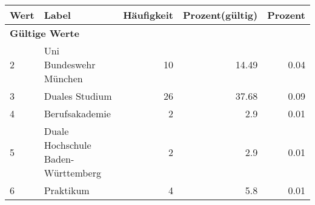      \begin{longtable}{lXrrr}
     \toprule
     \textbf{Wert} & \textbf{Label} & \textbf{Häufigkeit} & \textbf{Prozent(gültig)} & \textbf{Prozent} \\
     \endhead
     \midrule
     \multicolumn{5}{l}{\textbf{Gültige Werte}}\\

     2 &
     \multicolumn{1}{X}{ Uni Bundeswehr München   } &


       \num{10} &
       \num[round-mode=places,round-precision=2]{14.49} &
         \num[round-mode=places,round-precision=2]{0.04} \\

     3 &
     \multicolumn{1}{X}{ Duales Studium   } &


       \num{26} &
       \num[round-mode=places,round-precision=2]{37.68} &
         \num[round-mode=places,round-precision=2]{0.09} \\

     4 &
     \multicolumn{1}{X}{ Berufsakademie   } &


       \num{2} &
       \num[round-mode=places,round-precision=2]{2.9} &
         \num[round-mode=places,round-precision=2]{0.01} \\

     5 &
     \multicolumn{1}{X}{ Duale Hochschule Baden-Württemberg   } &


       \num{2} &
       \num[round-mode=places,round-precision=2]{2.9} &
         \num[round-mode=places,round-precision=2]{0.01} \\

     6 &
     \multicolumn{1}{X}{ Praktikum   } &


       \num{4} &
       \num[round-mode=places,round-precision=2]{5.8} &
         \num[round-mode=places,round-precision=2]{0.01} \\


\end{longtable}
